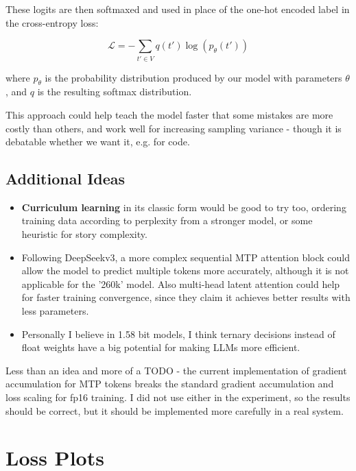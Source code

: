 \documentclass[10pt]{article}
\begin{document}
These logits are then softmaxed and used in place of the one-hot encoded label in the cross-entropy loss:

\begin{equation}
\mathcal{L} = -\sum_{t' \in V} q(t') \log(p_\theta(t'))
\end{equation}

where $p_\theta$ is the probability distribution produced by our model with parameters $\theta$, and $q$ is the resulting softmax distribution.

This approach could help teach the model faster that some mistakes are more costly than others, and work well for increasing sampling variance - though it is debatable whether we want it, e.g. for code.

\subsection{Additional Ideas}

\begin{itemize}[leftmargin=*,itemsep=0pt,topsep=0pt,parsep=0pt]
    \item \textbf{Curriculum learning} in its classic form would be good to try too, ordering training data according to perplexity from a stronger model, or some heuristic for story complexity.
    \item Following DeepSeekv3, a more complex sequential MTP attention block could allow the model to predict multiple tokens more accurately, although it is not applicable for the '260k' model. Also multi-head latent attention could help for faster training convergence, since they claim it achieves better results with less parameters.
    \item Personally I believe in 1.58 bit models, I think ternary decisions instead of float weights have a big potential for making LLMs more efficient.
\end{itemize}

Less than an idea and more of a TODO - the current implementation of gradient accumulation for MTP tokens breaks the standard gradient accumulation and loss scaling for fp16 training. I did not use either in the experiment, so the results should be correct, but it should be implemented more carefully in a real system.

\clearpage
\appendix
\section{Loss Plots}
\end{document}
